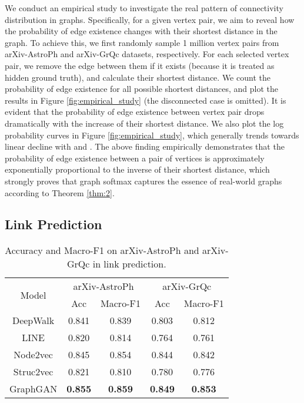 \documentclass[letterpaper]{article}
\begin{document}
		We conduct an empirical study to investigate the real pattern of connectivity distribution in graphs.
		Specifically, for a given vertex pair, we aim to reveal how the probability of edge existence changes with their shortest distance in the graph.
		To achieve this, we first randomly sample 1 million vertex pairs from arXiv-AstroPh and arXiv-GrQc datasets, respectively.
		For each selected vertex pair, we remove the edge between them if it exists (because it is treated as hidden ground truth), and calculate their shortest distance.
		We count the probability of edge existence for all possible shortest distances, and plot the results in Figure \ref{fig:empirical_study} (the disconnected case is omitted).
		It is evident that the probability of edge existence between vertex pair drops dramatically with the increase of their shortest distance.
		We also plot the log probability curves in Figure \ref{fig:empirical_study}, which generally trends towards linear decline with  and .
		The above finding empirically demonstrates that the probability of edge existence between a pair of vertices is approximately exponentially proportional to the inverse of their shortest distance, which strongly proves that graph softmax captures the essence of real-world graphs according to Theorem \ref{thm:2}.
	
	
	\subsection{Link Prediction}
		\begin{table}[t]
			\setlength{\abovecaptionskip}{3pt}
			\small
                	\centering
                	\caption{Accuracy and Macro-F1 on arXiv-AstroPh and arXiv-GrQc in link prediction.}
                	\begin{tabular}{|c|c|c|c|c|}
                    	\hline
                    	\multirow{2}{*}{Model} & \multicolumn{2}{c|}{arXiv-AstroPh} & \multicolumn{2}{c|}{arXiv-GrQc} \\
                    	\cline{2-5}
                    	& Acc & Macro-F1 & Acc & Macro-F1 \\
                    	\hline
                    	DeepWalk & 0.841 & 0.839 & 0.803 & 0.812 \\
                    	\hline
                    	LINE & 0.820 & 0.814 & 0.764 & 0.761 \\
                    	\hline
                    	Node2vec & 0.845 & 0.854 & 0.844 & 0.842  \\
                    	\hline
                    	Struc2vec & 0.821 & 0.810 & 0.780 & 0.776 \\
                    	\hline
                    	GraphGAN & \textbf{0.855} & \textbf{0.859} & \textbf{0.849} & \textbf{0.853} \\
                    	\hline
			\end{tabular}
			\label{table:link_prediction}
		\end{table}
		
\end{document}
